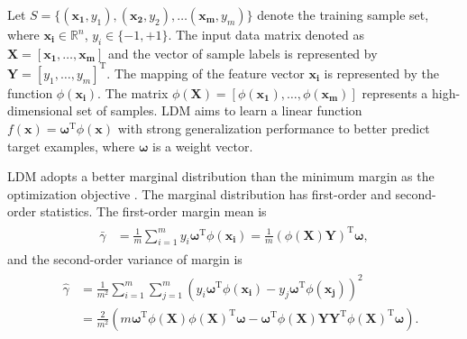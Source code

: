 \documentclass[a4paper]{cas-sc}
\begin{document}
Let $S=\{(\boldsymbol{x_1},y_1),(\boldsymbol{x_2},y_2),\ldots (\boldsymbol{x_m},y_m)\}$ denote the training sample set, where $\boldsymbol{x_i} \in {\mathbb{R}^{n}}$, $y_i \in \{-1,+1\}$. 
%
The input data matrix denoted as
$\boldsymbol{X} = [\boldsymbol{x_1},\ldots,\boldsymbol{x_m}]$ and the vector of sample labels is represented by $\boldsymbol{Y} = [y_1,\ldots,y_m]^{\mathrm{T}}$. 
%
The mapping of the feature vector $\boldsymbol{x_i}$ is represented by the function $\phi(\boldsymbol{x_i})$.
The matrix $\phi(\boldsymbol{X}) = [\phi(\boldsymbol{x_1}),\ldots,\phi(\boldsymbol{x_m})]$ represents a high-dimensional set of samples. LDM aims to learn a linear function $f(\boldsymbol{x}) = \boldsymbol{\omega}^\mathrm{T}\phi(\boldsymbol{x})$ with strong generalization performance to better predict target examples, where $\boldsymbol{\omega}$ is a weight vector.

LDM adopts a better marginal distribution than the minimum margin as the optimization objective \cite{GAO20131}. The marginal distribution has first-order and second-order statistics. The first-order margin mean is
\begin{align}\label{mean}
\begin{split}
\bar \gamma  &= \frac{1}{m}\sum\limits_{i = 1}^m y_{i}\boldsymbol{\omega}^\mathrm{T} \phi(\boldsymbol{x_i}) =  \frac{1}{m}(\phi(\boldsymbol{X})\boldsymbol{Y})^{\mathrm{T}}\boldsymbol{\omega},
\end{split}
\end{align}
and the second-order variance of margin is
\begin{align}\label{variance}
\begin{split}
\quad \widehat \gamma & = \frac{1}{m^2}\sum\limits_{i = 1}^m {\sum\limits_{j = 1}^m {{(y_{i}\boldsymbol{\omega}^\mathrm{T} \phi(\boldsymbol{x_i})-y_{j}\boldsymbol{\omega}^\mathrm{T} \phi(\boldsymbol{x_j}))^2}} }\\
& =\frac{2}{m^2}(m\boldsymbol{\omega}^{\mathrm{T}}\phi(\boldsymbol{X})\phi(\boldsymbol{X})^{\mathrm{T}}\boldsymbol{\omega} - \boldsymbol{\omega}^{\mathrm{T}}\phi(\boldsymbol{X})\boldsymbol{Y}\boldsymbol{Y}^{\mathrm{T}}\phi(\boldsymbol{X})^{\mathrm{T}}\boldsymbol{\omega}).
\end{split}
\end{align}
\end{document}
